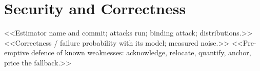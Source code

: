 \section{Security and Correctness}\label{sec:security}
<<Estimator name and commit; attacks run; binding attack; distributions.>>
<<Correctness / failure probability with its model; measured noise.>>
<<Pre-emptive defence of known weaknesses: acknowledge, relocate, quantify, anchor, price the fallback.>>
